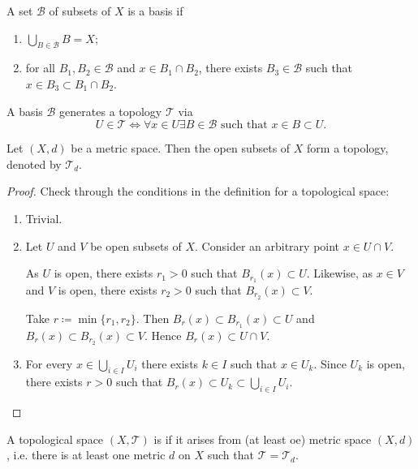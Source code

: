 \begin{definition}[Basis]
A set $\mathcal{B}$ of subsets of $X$ is a basis if
\begin{enumerate}[label=(\roman*)]
\item $\bigcup_{B\in\mathcal{B}}B=X$;
\item for all $B_1,B_2\in\mathcal{B}$ and $x\in B_1\cap B_2$, there exists $B_3\in\mathcal{B}$ such that $x\in B_3\subset B_1\cap B_2$.
\end{enumerate}
\end{definition}

\begin{theorem}
A basis $\mathcal{B}$ generates a topology $\mathcal{T}$ via
\[U\in\mathcal{T}\iff\forall x\in U\exists B\in\mathcal{B}\text{ such that }x\in B\subset U.\]
\end{theorem}

\begin{proposition}\label{prop:topo-metrisable}
Let $(X,d)$ be a metric space. Then the open subsets of $X$ form a topology, denoted by $\mathcal{T}_d$.
\end{proposition}

\begin{proof}
Check through the conditions in the definition for a topological space:
\begin{enumerate}[label=(\roman*)]
\item Trivial.
\item Let $U$ and $V$ be open subsets of $X$. Consider an arbitrary point $x\in U\cap V$.

As $U$ is open, there exists $r_1>0$ such that $B_{r_1}(x)\subset U$. Likewise, as $x\in V$ and $V$ is open, there exists $r_2>0$ such that $B_{r_2}(x)\subset V$.

Take $r\coloneqq\min\{r_1,r_2\}$. Then $B_r(x)\subset B_{r_1}(x)\subset U$ and $B_r(x)\subset B_{r_2}(x)\subset V$. Hence $B_r(x)\subset U\cap V$.

\item For every $x\in\bigcup_{i\in I}U_i$ there exists $k\in I$ such that $x\in U_k$. Since $U_k$ is open, there exists $r>0$ such that $B_r(x)\subset U_k\subset\bigcup_{i\in I}U_i$.
\end{enumerate}
\end{proof}

\begin{definition}
A topological space $(X,\mathcal{T})$ is  if it arises from (at least oe) metric space $(X,d)$, i.e. there is at least one metric $d$ on $X$ such that $\mathcal{T}=\mathcal{T}_d$.
\end{definition}

